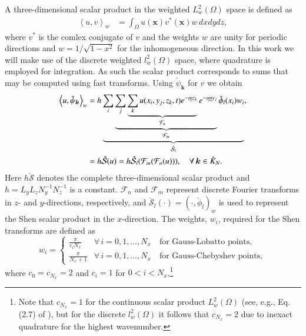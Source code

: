 \documentclass[preprint]{elsarticle}
\newcommand{\N}[1]{\check{#1}}
\begin{document}
A three-dimensional scalar product in the weighted $L^2_w(\Omega)$ space is defined as
\begin{align}
 \left<u, v\right>_w &= \int_{\Omega} {u(\bm{x}) v^*(\bm{x})}w\,dxdydz, 
\end{align}
where $v^*$ is the comlex conjugate of $v$ and the weights $w$ are unity for 
periodic directions and  $w=1/\sqrt{1-x^2}$ for the inhomogeneous direction. In 
this work we will make use of the discrete weighted $l^2_w(\Omega)$ space, 
where quadrature is employed for integration. As such the scalar product 
corresponds to sums that may be computed using fast transforms. Using 
$\N{\psi}_{\bm{k}}$ for $v$ we obtain
\begin{align}
 \left< u, \N{\psi}_{\bm{k}} \right>_w &= h \underbrace{\sum_i 
 \underbrace{\sum_j \underbrace{\sum_k u(x_i, y_j, z_k, t)  e^{-\imath 
 \underline{n} z_k}}_{\mathcal{F}_n}  e^{-\imath \underline{m} y_j} 
 }_{\mathcal{F}_m} \N{\phi}_{l}(x_i) w_i}_{\N{\mathcal{S}}_l},   \notag \\
  &=  h \N{\mathcal{S}}(u) = h \N{\mathcal{S}}_{l} (\mathcal{F}_{{m}} 
  (\mathcal{F}_{{n}}(u))), \quad \forall \, \bm{k} \in \N{K}_N. \label{eq:sst1}
\end{align}
Here $h\N{\mathcal{S}}$ denotes the complete three-dimensional scalar product 
and $h = L_yL_zN_y^{-1}N_z^{-1}$ is a constant. $\mathcal{F}_{{n}}$ and 
$\mathcal{F}_{{m}}$ represent discrete Fourier transforms in $z$- and 
$y$-directions, respectively, and $\N{\mathcal{S}}_{l}(\cdot) = (\cdot, 
\N{\phi}_l)_w$ is used to represent the Shen scalar product in the 
$x$-direction. The weights, $w_i$, required for the Shen transforms are 
defined as
\begin{equation}
 w_i = \begin{cases}
       \frac{\pi}{c_i N_x} &\forall \, i=0,1,\ldots, N_x \quad  \text{for 
       Gauss-Lobatto points},\\
       \frac{\pi}{N_x+1} &\forall \, i=0,1,\ldots, N_x  \quad \text{for 
       Gauss-Chebyshev points},      
 \end{cases}
\end{equation}
where $c_0 = c_{N_x} = 2$ and $c_i = 1$ for $0 < i < N_x$.\footnote{Note that 
$c_{N_x}=1$ for the continuous scalar product $L^2_w(\Omega)$ (see, e.g., Eq. 
(2.7) of \cite{Shen95}), but for the discrete $l^2_w(\Omega)$ it follows that 
$c_{N_x}=2$ due to inexact quadrature for the highest wavenumber.}
\end{document}
